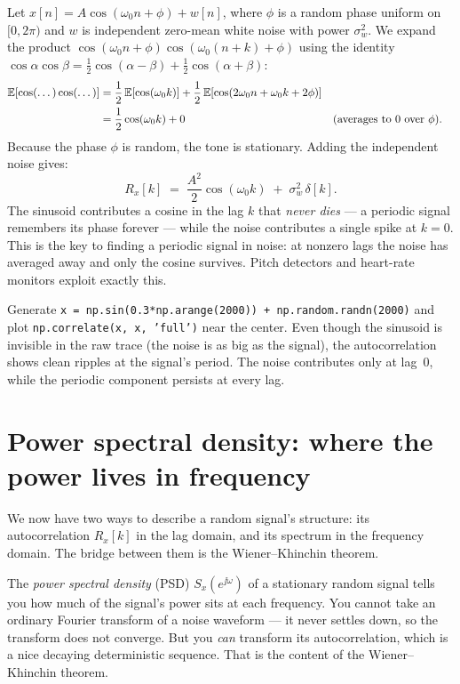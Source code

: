 \begin{example}
\label{ch20:ex-noisy-sine}
Let $x[n] = A\cos(\omega_0 n + \phi) + w[n]$, where $\phi$ is a random phase
uniform on $[0,2\pi)$ and $w$ is independent zero-mean white noise with power
$\sigma_w^2$. We expand the product $\cos(\omega_0 n + \phi) \cos(\omega_0 (n+k) + \phi)$ using the identity $\cos\alpha\cos\beta = \tfrac12\cos(\alpha-\beta) + \tfrac12\cos(\alpha+\beta)$:
\begin{align*}
  \operatorname{\mathbb{E}}[\cos(\dots)\cos(\dots)] &= \frac{1}{2}\operatorname{\mathbb{E}}[\cos(\omega_0 k)] + \frac{1}{2}\operatorname{\mathbb{E}}[\cos(2\omega_0 n + \omega_0 k + 2\phi)] \\
  &= \frac{1}{2}\cos(\omega_0 k) + 0 &&\text{(averages to 0 over $\phi$)}.
\end{align*}
Because the phase $\phi$ is random, the tone is stationary. Adding the independent noise gives:
\[
  R_x[k] \;=\; \frac{A^2}{2}\cos(\omega_0 k) \;+\; \sigma_w^2\,\delta[k].
\]
The sinusoid contributes a cosine in the lag $k$ that \emph{never dies} --- a
periodic signal remembers its phase forever --- while the noise contributes a
single spike at $k=0$. This is the key to finding a periodic signal in noise: at
nonzero lags the noise has averaged away and only the cosine survives. Pitch
detectors and heart-rate monitors exploit exactly this.
\end{example}

\begin{labbox}
Generate \texttt{x = np.sin(0.3*np.arange(2000)) + np.random.randn(2000)} and
plot \texttt{np.correlate(x, x, 'full')} near the center. Even though the
sinusoid is invisible in the raw trace (the noise is as big as the signal), the
autocorrelation shows clean ripples at the signal's period. The noise contributes
only at lag~$0$, while the periodic component persists at every lag.
\end{labbox}

\section{Power spectral density: where the power lives in frequency}
\label{ch20:psd}

We now have two ways to describe a random signal's structure: its
autocorrelation $R_x[k]$ in the lag domain, and its
spectrum in the frequency domain. The bridge between them is the Wiener--Khinchin theorem.

The \emph{power spectral density} (PSD) $S_x(e^{\jj\omega})$ of a stationary
random signal tells you how much of the signal's power sits at each frequency.
You cannot take an ordinary Fourier transform of a noise waveform --- it never
settles down, so the transform does not converge. But you \emph{can} transform
its autocorrelation, which is a nice decaying deterministic sequence. That is the
content of the Wiener--Khinchin theorem.

